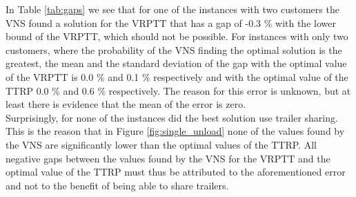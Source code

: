 
In Table \ref{tab:gaps} we see that for one of the instances with two customers the VNS found a solution for the VRPTT that has a gap of -0.3 \% with the lower bound of the VRPTT, which should not be possible.
For instances with only two customers, where the probability of the VNS finding the optimal solution is the greatest, the mean and the standard deviation of the gap with the optimal value of the VRPTT is 0.0 \% and 0.1 \% respectively and with the optimal value of the TTRP 0.0 \% and 0.6 \% respectively.
The reason for this error is unknown, but at least there is evidence that the mean of the error is zero. \\


Surprisingly, for none of the instances did the best solution use trailer sharing.
This is the reason that in Figure \ref{fig:single_unload} none of the values found by the VNS are significantly lower than the optimal values of the TTRP.
All negative gaps between the values found by the VNS for the VRPTT and the optimal value of the TTRP must thus be attributed to the aforementioned error and not to the benefit of being able to share trailers. \\

